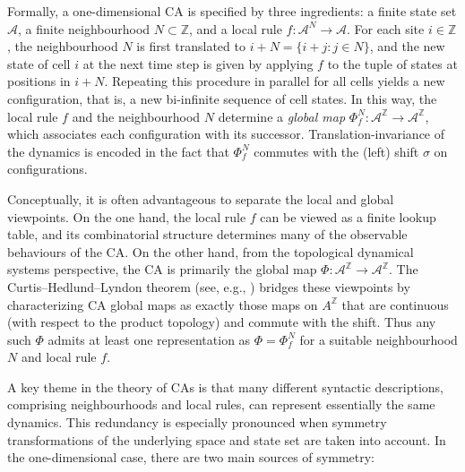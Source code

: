 \documentclass[a4paper]{article}
\begin{document}
Formally, a one-dimensional CA is specified by three ingredients: a finite state
set $\mathcal{A}$, a finite neighbourhood $N \subset \mathbb{Z}$, and a local rule
$f : \mathcal{A}^{N} \to \mathcal{A}$. For each site $i \in \mathbb{Z}$, the neighbourhood $N$ is
first translated to $i+N = \{ i+j : j \in N\}$, and the new state of cell $i$ at the
next time step is given by applying $f$ to the tuple of states at positions in
$i+N$. Repeating this procedure in parallel for all cells yields a new
configuration, that is, a new bi-infinite sequence of cell states. In this way, the
local rule $f$ and the neighbourhood $N$ determine a \emph{global map}
$\Phi_{f}^{N} : \mathcal{A}^{\mathbb{Z}} \to \mathcal{A}^{\mathbb{Z}}$, which associates each configuration with
its successor. Translation-invariance of the dynamics is encoded in the fact that
$\Phi_{f}^{N}$ commutes with the (left) shift $\sigma$ on configurations.

Conceptually, it is often advantageous to separate the local and global viewpoints.
On the one hand, the local rule $f$ can be viewed as a finite lookup table, and
its combinatorial structure determines many of the observable behaviours of the
CA. On the other hand, from the topological dynamical systems perspective,
the CA is primarily the global map $\Phi : \mathcal{A}^{\mathbb{Z}} \to \mathcal{A}^{\mathbb{Z}}$. The
Curtis--Hedlund--Lyndon theorem (see, e.g., \cite{DBLP:journals/mst/Hedlund69,Lind_Marcus_1995})
bridges these viewpoints by characterizing CA global maps as exactly those maps
on $A^{\mathbb{Z}}$ that are continuous (with respect to the product topology) and
commute with the shift. Thus any such $\Phi$ admits at least one representation
as $\Phi = \Phi_{f}^{N}$ for a suitable neighbourhood $N$ and local rule $f$.

A key theme in the theory of CAs is that many different syntactic descriptions,
comprising neighbourhoods and local rules, can represent essentially the same
dynamics. This redundancy is especially pronounced when symmetry transformations
of the underlying space and state set are taken into account. In the one-dimensional
case, there are two main sources of symmetry:
\end{document}
